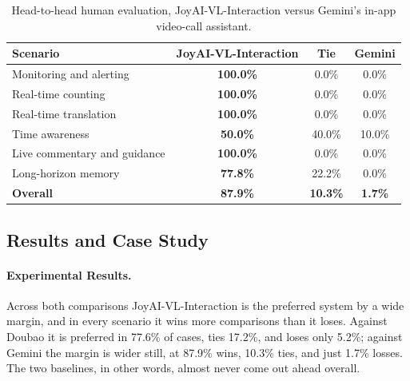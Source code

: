 \begin{table}[h]
\centering
\renewcommand{\arraystretch}{1.3}
\begin{tabular}{lccc}
\toprule
\textbf{Scenario} & \textbf{JoyAI-VL-Interaction} & \textbf{Tie} & \textbf{Gemini} \\
\midrule
Monitoring and alerting      & \textbf{100.0\%} & 0.0\%  & 0.0\%  \\
Real-time counting                & \textbf{100.0\%} & 0.0\%  & 0.0\%  \\
Real-time translation        & \textbf{100.0\%} & 0.0\%  & 0.0\%  \\
Time awareness               & \textbf{50.0\%}  & 40.0\% & 10.0\% \\
Live commentary and guidance & \textbf{100.0\%} & 0.0\%  & 0.0\%  \\
Long-horizon memory          & \textbf{77.8\%}  & 22.2\% & 0.0\%  \\
\midrule
\textbf{Overall}             & \textbf{87.9\%}  & \textbf{10.3\%} & \textbf{1.7\%} \\
\bottomrule
\end{tabular}
\caption{Head-to-head human evaluation, JoyAI-VL-Interaction versus Gemini's in-app video-call assistant.}
\end{table}




\subsection{Results and Case Study}

\paragraph{\textbf{Experimental Results.}}
Across both comparisons JoyAI-VL-Interaction is the preferred system by a wide margin, and in every scenario it wins more comparisons than it loses. Against Doubao it is preferred in 77.6\% of cases, ties 17.2\%, and loses only 5.2\%; against Gemini the margin is wider still, at 87.9\% wins, 10.3\% ties, and just 1.7\% losses. The two baselines, in other words, almost never come out ahead overall.

